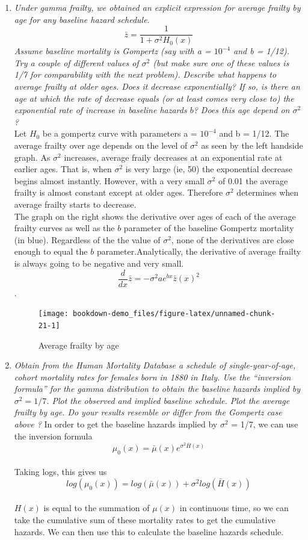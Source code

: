 \documentclass[]{book}
\begin{document}
\begin{enumerate}
\def\labelenumi{\arabic{enumi}.}
\item
  \emph{Under gamma frailty, we obtained an explicit expression for average frailty by age for any baseline hazard schedule. \[ \bar{z}=\frac{1}{1+\sigma^2 H_0(x)}\] Assume baseline mortality is Gompertz (say with a = \(10^{-4}\) and b = 1/12). Try a couple of different values of \(\sigma^2\) (but make sure one of these values is 1/7 for comparability with the next problem). Describe what happens to average frailty at older ages. Does it decrease exponentially? If so, is there an age at which the rate of decrease equals (or at least comes very close to) the exponential rate of increase in baseline hazards \(b\)? Does this age depend on \(\sigma^2\)?}\\
  Let \(H_0\) be a gompertz curve with parameters a = \(10^{-4}\) and b = 1/12. The average frailty over age depends on the level of \(\sigma^2\) as seen by the left handside graph. As \(\sigma^2\) increases, average fraily decreases at an exponential rate at earlier ages. That is, when \(\sigma^2\) is very large (ie, 50) the exponential decrease begins almost instantly. However, with a very small \(\sigma^2\) of 0.01 the average frailty is almost constant except at older ages. Therefore \(\sigma^2\) determines when average frailty starts to decrease.\\
  The graph on the right shows the derivative over ages of each of the average frailty curves as well as the \(b\) parameter of the baseline Gompertz mortality (in blue). Regardless of the the value of \(\sigma^2\), none of the derivatives are close enough to equal the \(b\) parameter.Analytically, the derivative of average frailty is always going to be negative and very small. \[\frac{d}{dx}\bar{z}= -\sigma^2ae^{bx}\bar{z}(x)^2\].\\

  \begin{figure}
   \texttt{[image: bookdown-demo\_files/figure-latex/unnamed-chunk-21-1]} \caption{Average frailty by age}\label{fig:unnamed-chunk-21}
   \end{figure}
\item
  \emph{Obtain from the Human Mortality Database a schedule of single-year-of-age, cohort mortality rates for females born in 1880 in Italy. Use the ``inversion formula'' for the gamma distribution to obtain the baseline hazards implied by \(\sigma^2= 1/7\). Plot the observed and implied baseline schedule. Plot the average frailty by age. Do your results resemble or differ from the Gompertz case above ?}
  In order to get the baseline hazards implied by \(\sigma^2\) = 1/7, we can use the inversion formula \[\mu_0 (x) = \bar{\mu}(x)e^{\sigma^2\bar{H}(x)}\]\\
  Taking logs, this gives us \[log(\mu_0 (x)) = log(\bar{\mu}(x))+{\sigma^2log(\bar{H}(x))}\]\\
  \(H(x)\) is equal to the summation of \(\mu(x)\) in continuous time, so we can take the cumulative sum of these mortality rates to get the cumulative hazards. We can then use this to calculate the baseline hazards schedule.\\


\end{enumerate}
\end{document}
